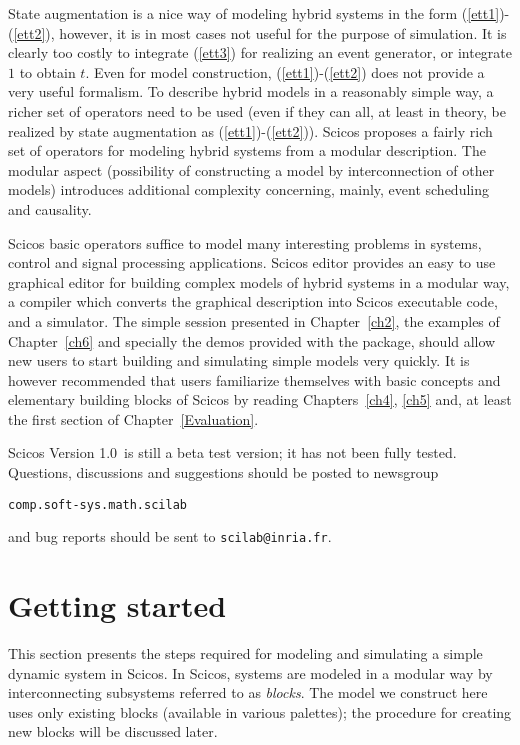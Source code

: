 \documentclass{book}
\newcommand{\version}{Version 1.0}
\begin{document}
State augmentation is a nice way of modeling hybrid systems in the form 
(\ref{ett1})-(\ref{ett2}), however, it is in most cases not useful for
the purpose of simulation. It is clearly too costly to integrate
(\ref{ett3}) for realizing an event generator, or integrate $1$ to
obtain $t$. Even for model construction, (\ref{ett1})-(\ref{ett2})
does not provide a very useful formalism. To describe hybrid models in
a reasonably simple way, a richer set of operators need to be used
(even if they can all, at least in theory, be realized by state
augmentation as (\ref{ett1})-(\ref{ett2})).
Scicos proposes a fairly rich set of
operators for modeling hybrid systems from a modular description. The
modular aspect (possibility of constructing a model by
interconnection of other models) introduces additional complexity
concerning, mainly, event scheduling and causality. 

\bigskip

Scicos basic operators suffice to model many interesting problems
in systems, control and signal processing applications. 
Scicos editor provides an easy to use graphical editor for building complex
models of hybrid systems in a modular way, a compiler which converts
the graphical description into Scicos executable code, and a simulator.
The simple session presented in Chapter~\ref{ch2},
the examples of Chapter~\ref{ch6} 
and specially the demos provided with the package, should allow new
users to start building and simulating simple models very quickly. It
is however recommended that users familiarize
themselves with basic concepts and elementary building blocks of
Scicos by reading Chapters~\ref{ch4}, \ref{ch5} and, at least the
first section of Chapter~\ref{Evaluation}. 

\bigskip

Scicos  \version\ is still a beta test version; 
it has not been fully tested.
Questions, discussions and suggestions should be posted to newsgroup 
\begin{center}
{\tt comp.soft-sys.math.scilab}
\end{center}
and bug reports should be sent to {\tt scilab@inria.fr}.



\chapter{Getting started}
\label{scasm}
\label{ch2}
This section presents the steps required for modeling and simulating a simple
dynamic system in Scicos. In Scicos, systems are modeled in a modular way
by interconnecting subsystems referred to as {\em blocks}. The model we
construct here uses
only existing blocks (available in various palettes); the procedure for creating
new blocks will be discussed later.
\end{document}
